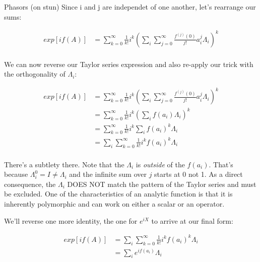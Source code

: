 \begin{answer}
\begin{answerpart}{Phasors (on stun)}
  Since i and j are independet of one another, let's rearrange our sums:

  \begin{equation}
    \begin{split}
      exp[if(A)]
      &= \sum_{k=0}^{\infty} \frac{1}{k!} i^k\left(\sum_i\sum_{j=0}^{\infty} \frac{f^{(j)}(0)}{j!}a_i^j\Lambda_i\right)^k\\
    \end{split}
  \end{equation}

  We can now reverse our Taylor series expression and also re-apply
  our trick with the orthogonality of $\Lambda_i$:

  \begin{equation}
    \begin{split}
      exp[if(A)]
      &= \sum_{k=0}^{\infty} \frac{1}{k!} i^k\left(\sum_i\sum_{j=0}^{\infty} \frac{f^{(j)}(0)}{j!}a_i^j\Lambda_i\right)^k\\
      &= \sum_{k=0}^{\infty} \frac{1}{k!} i^k\left(\sum_if(a_i)\Lambda_i\right)^k\\
      &= \sum_{k=0}^{\infty} \frac{1}{k!} i^k\sum_if(a_i)^k\Lambda_i\\
      &= \sum_i\sum_{k=0}^{\infty} \frac{1}{k!} i^kf(a_i)^k\Lambda_i\\
    \end{split}
  \end{equation}

  There's a subtlety there.  Note that the $\Lambda_i$ is
  \emph{outside} of the $f(a_i)$.  That's because $\Lambda_i^0 = I \ne
  \Lambda_i$ and the infinite sum over $j$ starts at 0 not 1.  As a
  direct consequence, the $\Lambda_i$ DOES NOT match the pattern of
  the Taylor series and must be excluded.  One of the characteristics
  of an analytic function is that it is inherently polymorphic and can
  work on either a scalar or an operator.

  We'll reverse one more identity, the one for $e^{iX}$ to arrive at
  our final form:
  
  \begin{equation}
    \begin{split}
      exp[if(A)]
      &= \sum_i\sum_{k=0}^{\infty} \frac{1}{k!} i^kf(a_i)^k\Lambda_i\\
      &= \sum_i e^{if(a_i)}\Lambda_i\\
    \end{split}
  \end{equation}


\end{answerpart}
\end{answer}

